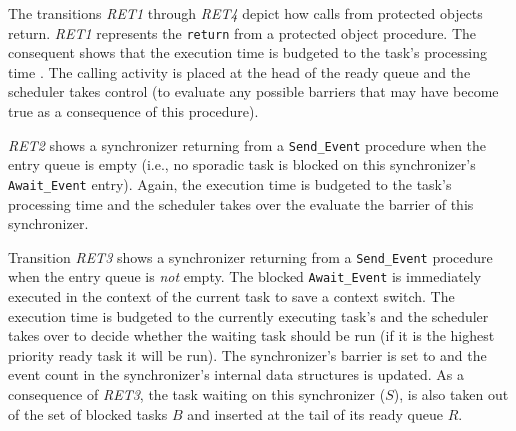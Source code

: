 The transitions \emph{RET1} through \emph{RET4} depict how calls from
protected objects return. \emph{RET1} represents the \texttt{return}
from a protected object procedure. The consequent shows that the
execution time is budgeted to the task's processing time . The
calling activity is placed at the head of the ready queue and the
scheduler takes control (to evaluate any possible barriers that may
have become true as a consequence of this procedure).


\emph{RET2} shows a synchronizer returning from a \texttt{Send\_Event}
procedure when the entry queue is empty (i.e., no sporadic task is
blocked on this synchronizer's \texttt{Await\_Event} entry). Again,
the execution time is budgeted to the task's processing time 
and the scheduler takes over the evaluate the barrier of this
synchronizer.


Transition \emph{RET3} shows a synchronizer returning from a
\texttt{Send\_Event} procedure when the entry queue is \emph{not}
empty. The blocked \texttt{Await\_Event} is immediately executed in
the context of the current task to save a context switch. The
execution time is budgeted to the currently executing task's 
and the scheduler takes over to decide whether the waiting task should
be run (if it is the highest priority ready task it will be run). The
synchronizer's barrier is set to  and the event count in the
synchronizer's internal data structures is updated. As a consequence
of \emph{RET3}, the task waiting on this synchronizer ($S$), is also
taken out of the set of blocked tasks $B$ and inserted at the tail of
its ready queue $R$.

